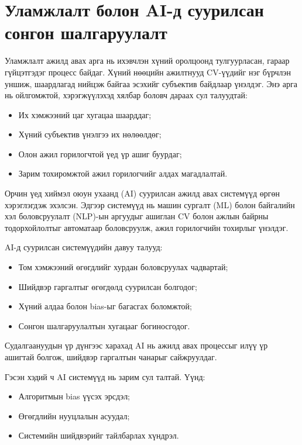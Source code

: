 \section{Уламжлалт болон AI-д суурилсан сонгон шалгаруулалт}

\par{}Уламжлалт ажилд авах арга нь ихэвчлэн хүний оролцоонд тулгуурласан, гараар гүйцэтгэдэг процесс байдаг. Хүний нөөцийн ажилтнууд CV-үүдийг нэг бүрчлэн уншиж, шаардлагад нийцэж байгаа эсэхийг субъектив байдлаар үнэлдэг. Энэ арга нь ойлгомжтой, хэрэгжүүлэхэд хялбар боловч дараах сул талуудтай:

\begin{itemize}
    \item Их хэмжээний цаг хугацаа шаарддаг;
    \item Хүний субъектив үнэлгээ их нөлөөлдөг;
    \item Олон ажил горилогчтой үед үр ашиг буурдаг;
    \item Зарим тохиромжтой ажил горилогчийг алдах магадлалтай.
\end{itemize}   

\par{}Орчин үед хиймэл оюун ухаанд (AI) суурилсан ажилд авах системүүд өргөн хэрэглэгдэж эхэлсэн. Эдгээр системүүд нь машин сургалт (ML) болон байгалийн хэл боловсруулалт (NLP)-ын аргуудыг ашиглан CV болон ажлын байрны тодорхойлолтыг автоматаар боловсруулж, ажил горилогчийн тохирлыг үнэлдэг.

AI-д суурилсан системүүдийн давуу талууд:
\begin{itemize}
    \item Том хэмжээний өгөгдлийг хурдан боловсруулах чадвартай;
    \item Шийдвэр гаргалтыг өгөгдөлд суурилсан болгодог;
    \item Хүний алдаа болон bias-ыг багасгах боломжтой;
    \item Сонгон шалгаруулалтын хугацааг богиносгодог.
\end{itemize} 

\par{}Судалгаануудын үр дүнгээс харахад AI нь ажилд авах процессыг илүү үр ашигтай болгож, шийдвэр гаргалтын чанарыг сайжруулдаг\cite{smart_hiring_ai}.

Гэсэн хэдий ч AI системүүд нь зарим сул талтай. Үүнд:
\begin{itemize}
    \item Алгоритмын bias үүсэх эрсдэл;
    \item Өгөгдлийн нууцлалын асуудал;
    \item Системийн шийдвэрийг тайлбарлах хүндрэл.
\end{itemize}

